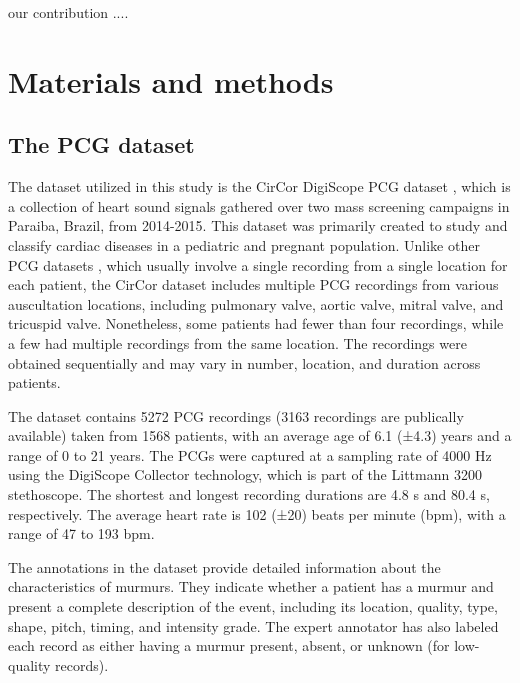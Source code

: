 \documentclass{article}
\begin{document}
\par our contribution ....


\section{Materials and methods}
\subsection{The PCG dataset}
The dataset utilized in this study is the CirCor DigiScope PCG dataset \cite{Reyna2022.08.11.22278688,oliveira2021circor}, which is a collection of heart sound signals gathered over two mass screening campaigns in Paraiba, Brazil, from 2014-2015. This dataset was primarily created to study and classify cardiac diseases in a pediatric and pregnant population. Unlike other PCG datasets \cite{clifford2016classification,kazemnejad2021open}, which usually involve a single recording from a single location for each patient, the CirCor dataset includes multiple PCG recordings from various auscultation locations, including pulmonary valve, aortic
valve, mitral valve, and tricuspid valve. Nonetheless, some patients had fewer than four recordings, while a few had multiple recordings from the same location. The recordings were obtained sequentially and may vary in number, location, and duration across patients.

\par The dataset contains 5272 PCG recordings (3163 recordings are publically available) taken from 1568 patients, with an average age of 6.1 (±4.3) years and a range of 0 to 21 years. The PCGs were captured at a sampling rate of 4000 Hz using the DigiScope Collector technology, which is part of the Littmann 3200 stethoscope. The shortest and longest recording durations are 4.8 s and 80.4 s, respectively. The average heart rate is 102 (±20) beats per minute (bpm), with a range of 47 to 193 bpm.

\par The annotations in the dataset provide detailed information about the characteristics of murmurs. They indicate whether a patient has a murmur and present a complete description of the event, including its location, quality, type, shape, pitch, timing, and intensity grade. The expert annotator has also labeled each record as either having a murmur present, absent, or unknown (for low-quality records).
\end{document}
